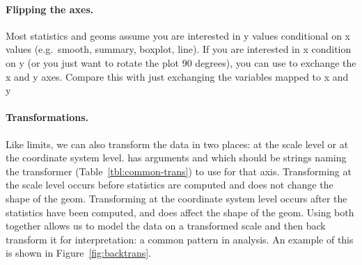% 


\paragraph{Flipping the axes.}  Most statistics and geoms assume you are interested in y values conditional on x values (e.g.\ smooth, summary, boxplot, line).  If you are interested in x condition on y (or you just want to rotate the plot 90 degrees), you can use  to exchange the x and y axes.  Compare this with just exchanging the variables mapped to x and y

% 


\paragraph{Transformations.}  Like limits, we can also transform the data in two places: at the scale level or at the coordinate system level.  has arguments  and  which should be strings naming the transformer (Table~\ref{tbl:common-trans}) to use for that axis. Transforming at the scale level occurs before statistics are computed and does not change the shape of the geom.  Transforming at the coordinate system level occurs after the statistics have been computed, and does affect the shape of the geom.  Using both together allows us to model the data on a transformed scale and then back transform it for interpretation: a common pattern in analysis.  An example of this is shown in Figure~\ref{fig:backtrans}.

